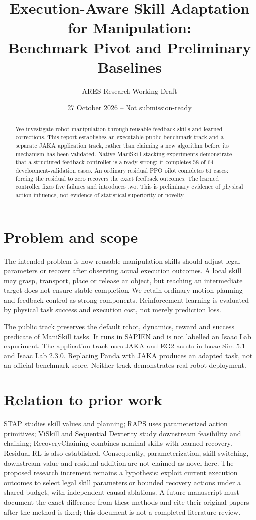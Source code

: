 \documentclass[10pt,a4paper]{article}
\title{Execution-Aware Skill Adaptation for Manipulation:\\Benchmark Pivot and Preliminary Baselines}
\author{ARES Research Working Draft}
\date{27 October 2026 -- Not submission-ready}
\begin{document}
\maketitle
\begin{abstract}
We investigate robot manipulation through reusable feedback skills and learned
corrections. This report establishes an executable public-benchmark track and a
separate JAKA application track, rather than claiming a new algorithm before its
mechanism has been validated. Native ManiSkill stacking experiments demonstrate
that a structured feedback controller is already strong: it completes 58 of 64
development-validation cases. An ordinary residual PPO pilot completes 61 cases;
forcing the residual to zero recovers the exact feedback outcomes. The learned
controller fixes five failures and introduces two. This is preliminary evidence
of physical action influence, not evidence of statistical superiority or novelty.
\end{abstract}

\section{Problem and scope}
The intended problem is how reusable manipulation skills should adjust legal
parameters or recover after observing actual execution outcomes. A local skill
may grasp, transport, place or release an object, but reaching an intermediate
target does not ensure stable completion. We retain ordinary motion planning and
feedback control as strong components. Reinforcement learning is evaluated by
physical task success and execution cost, not merely prediction loss.

The public track preserves the default robot, dynamics, reward and success
predicate of ManiSkill tasks. It runs in SAPIEN and is not labelled an Isaac Lab
experiment. The application track uses JAKA and EG2 assets in Isaac Sim 5.1 and
Isaac Lab 2.3.0. Replacing Panda with JAKA produces an adapted task, not an
official benchmark score. Neither track demonstrates real-robot deployment.

\section{Relation to prior work}
STAP studies skill values and planning; RAPS uses parameterized action primitives;
ViSkill and Sequential Dexterity study downstream feasibility and chaining;
RecoveryChaining combines nominal skills with learned recovery. Residual RL is
also established. Consequently, parameterization, skill switching, downstream
value and residual addition are not claimed as novel here. The proposed research
increment remains a hypothesis: exploit current execution outcomes to select
legal skill parameters or bounded recovery actions under a shared budget, with
independent causal ablations. A future manuscript must document the exact
difference from these methods and cite their original papers after the method
is fixed; this document is not a completed literature review.
\end{document}
